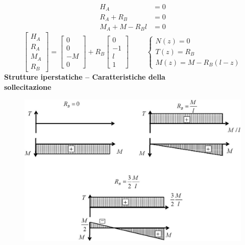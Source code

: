 \documentclass{article}
\begin{document}
\begin{adjustwidth}{2in}{}
		\[
		\begin{split}
			H_A & = 0 \\
			R_A + R_B & = 0 \\
			M_A + M -R_Bl & = 0
		\end{split}
		\]
		\[
		\left[ \begin{array}{c}
			H_A \\
			R_A \\
			M_A \\
			R_B
		\end{array}\right] = \left[ \begin{array}{c}
		0 \\
		0 \\
		-M \\
		0
		\end{array}\right] + R_B \left[ \begin{array}{c}
		0 \\
		-1 \\
		l \\
		1
		\end{array}\right] \hspace{1cm} \begin{cases}
		N(z) = 0 \\
		T(z) = R_B \\
		M(z) = M - R_B(l-z)
		\end{cases}
		\]
{\Large \textbf{Strutture iperstatiche – Caratteristiche della \\ sollecitazione}} \mbox{} \newline
\begin{figure}[H]
	\centering
	\includegraphics[width=0.8\linewidth]{"immagini/1.PARTE8_Pagina_39"}
\end{figure}


\end{adjustwidth}
\end{document}
